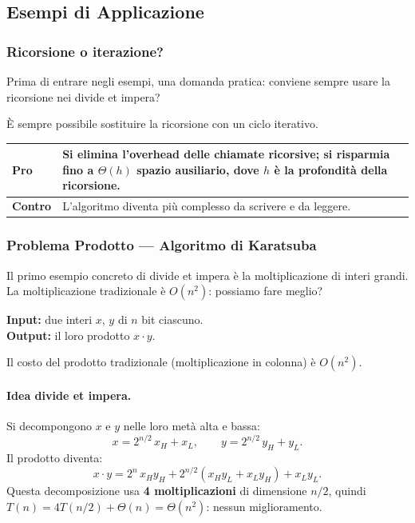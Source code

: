 \subsection{Esempi di Applicazione}
\subsubsection{Ricorsione o iterazione?}

\begin{softnote}
	Prima di entrare negli esempi, una domanda pratica: conviene sempre
	usare la ricorsione nei divide et impera?
\end{softnote}

È sempre possibile sostituire la ricorsione con un ciclo iterativo.

\begin{center}
	\begin{tabular}{lp{7cm}}
		\toprule
		\textbf{Pro} & Si elimina l'overhead delle chiamate ricorsive;
		si risparmia fino a $\Theta(h)$ spazio ausiliario,
		dove $h$ è la profondità della ricorsione. \\
		\midrule
		\textbf{Contro} & L'algoritmo diventa più complesso da scrivere
		e da leggere. \\
		\bottomrule
	\end{tabular}
\end{center}

\subsubsection{Problema Prodotto — Algoritmo di Karatsuba}

\begin{softnote}
	Il primo esempio concreto di divide et impera è la moltiplicazione
	di interi grandi. La moltiplicazione tradizionale è $O(n^2)$:
	possiamo fare meglio?
\end{softnote}

\begin{definizione}
	\textbf{Input:} due interi $x$, $y$ di $n$ bit ciascuno.\\
	\textbf{Output:} il loro prodotto $x \cdot y$.
\end{definizione}

Il costo del prodotto tradizionale (moltiplicazione in colonna) è $O(n^2)$.

\paragraph{Idea divide et impera.}
Si decompongono $x$ e $y$ nelle loro metà alta e bassa:
\[
x = 2^{n/2}\,x_H + x_L, \qquad y = 2^{n/2}\,y_H + y_L.
\]
Il prodotto diventa:
\[
x \cdot y = 2^n\,x_H y_H
+ 2^{n/2}(x_H y_L + x_L y_H)
+ x_L y_L.
\]
Questa decomposizione usa \textbf{4 moltiplicazioni} di dimensione $n/2$,
quindi $T(n) = 4T(n/2) + \Theta(n) = \Theta(n^2)$: nessun miglioramento.

